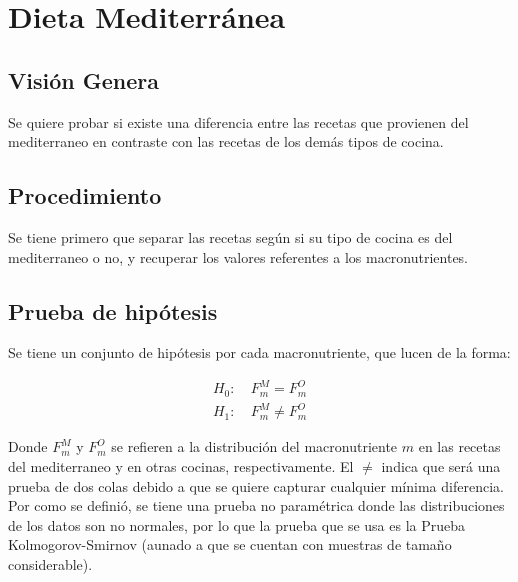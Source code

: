 \documentclass[12pt,a4paper]{article}
\begin{document}
    \newpage


    \section{Dieta Mediterránea}
    {
        \subsection{Visión Genera}
        {
            Se quiere probar si existe una diferencia entre las 
            recetas que provienen del mediterraneo en contraste 
            con las recetas de los demás tipos de cocina.
        }

        \subsection{Procedimiento}
        {
            Se tiene primero que separar las recetas según si su 
            tipo de cocina es del mediterraneo o no, y recuperar los 
            valores referentes a los macronutrientes.
        }

        \subsection{Prueba de hipótesis}
        {
            Se tiene un conjunto de hipótesis por cada macronutriente, que 
            lucen de la forma:

            \begin{align*}
                H_0 :&\ F^{M}_{m} = F^{O}_{m} \\ 
                H_1 :&\ F^{M}_{m} \ne F^{O}_{m}
            \end{align*}

            Donde $F^{M}_{m}$ y $F^{O}_{m}$ se refieren a la distribución del 
            macronutriente $m$ en las recetas del mediterraneo y en otras cocinas, 
            respectivamente. El $\ne$ indica que será una prueba de dos colas debido 
            a que se quiere capturar cualquier mínima diferencia.\\

            Por como se definió, se tiene una prueba no paramétrica donde las distribuciones 
            de los datos son no normales, por lo que la prueba que se usa es la Prueba 
            Kolmogorov-Smirnov (aunado a que se cuentan con muestras de tamaño considerable).
        }
    }

    \newpage
\end{document}
